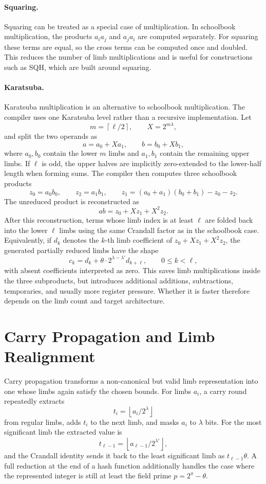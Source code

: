\paragraph{Squaring.}
Squaring can be treated as a special case of multiplication. In schoolbook multiplication, the products \(a_i a_j\) and \(a_j a_i\) are computed separately. For squaring these terms are equal, so the cross terms can be computed once and doubled. This reduces the number of limb multiplications and is useful for constructions such as SQH, which are built around squaring.

\paragraph{Karatsuba.}
Karatsuba multiplication is an alternative to schoolbook multiplication. The compiler uses one Karatsuba level rather than a recursive implementation. Let
\[
    m=\left\lceil \ell/2 \right\rceil,\qquad X=2^{m\lambda},
\]
and split the two operands as
\[
    a=a_0+Xa_1,\qquad b=b_0+Xb_1,
\]
where \(a_0,b_0\) contain the lower \(m\) limbs and \(a_1,b_1\) contain the remaining upper limbs. If \(\ell\) is odd, the upper halves are implicitly zero-extended to the lower-half length when forming sums. The compiler then computes three schoolbook products
\[
    z_0=a_0b_0,\qquad
    z_2=a_1b_1,\qquad
    z_1=(a_0+a_1)(b_0+b_1)-z_0-z_2.
\]
The unreduced product is reconstructed as
\[
    ab = z_0 + Xz_1 + X^2z_2.
\]
After this reconstruction, terms whose limb index is at least \(\ell\) are folded back into the lower \(\ell\) limbs using the same Crandall factor as in the schoolbook case. Equivalently, if \(d_k\) denotes the \(k\)-th limb coefficient of \(z_0+Xz_1+X^2z_2\), the generated partially reduced limbs have the shape
\[
    c_k = d_k + \theta \cdot 2^{\lambda-\lambda'} d_{k+\ell},
    \qquad 0 \leq k < \ell,
\]
with absent coefficients interpreted as zero. This saves limb multiplications inside the three subproducts, but introduces additional additions, subtractions, temporaries, and usually more register pressure. Whether it is faster therefore depends on the limb count and target architecture.

\section{Carry Propagation and Limb Realignment}
\label{sec:carry-realignment}

Carry propagation transforms a non-canonical but valid limb representation into one whose limbs again satisfy the chosen bounds. For limbs \(a_i\), a carry round repeatedly extracts
\[
    t_i = \left\lfloor a_i / 2^\lambda \right\rfloor
\]
from regular limbs, adds \(t_i\) to the next limb, and masks \(a_i\) to \(\lambda\) bits. For the most significant limb the extracted value is
\[
    t_{\ell-1} = \left\lfloor a_{\ell-1} / 2^{\lambda'} \right\rfloor,
\]
and the Crandall identity sends it back to the least significant limb as \(t_{\ell-1}\theta\). A full reduction at the end of a hash function additionally handles the case where the represented integer is still at least the field prime \(p=2^\pi-\theta\).

